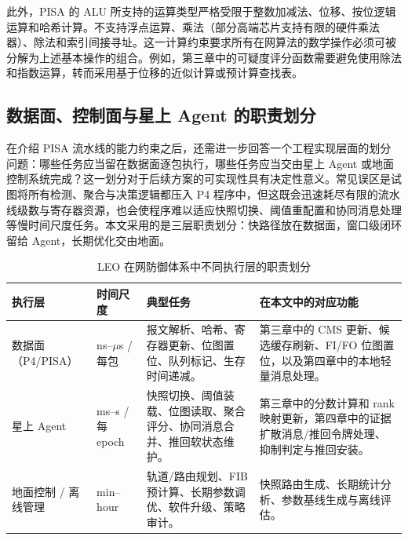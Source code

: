 此外，PISA 的 ALU 所支持的运算类型严格受限于整数加减法、位移、按位逻辑运算和哈希计算。不支持浮点运算、乘法（部分高端芯片支持有限的硬件乘法器）、除法和索引间接寻址。这一计算约束要求所有在网算法的数学操作必须可被分解为上述基本操作的组合。例如，第三章中的可疑度评分函数需要避免使用除法和指数运算，转而采用基于位移的近似计算或预计算查找表。


\subsection{数据面、控制面与星上 Agent 的职责划分}

在介绍 PISA 流水线的能力约束之后，还需进一步回答一个工程实现层面的划分问题：哪些任务应当留在数据面逐包执行，哪些任务应当交由星上 Agent 或地面控制系统完成？这一划分对于后续方案的可实现性具有决定性意义。常见误区是试图将所有检测、聚合与决策逻辑都压入 P4 程序中，但这既会迅速耗尽有限的流水线级数与寄存器资源，也会使程序难以适应快照切换、阈值重配置和协同消息处理等慢时间尺度任务。本文采用的是三层职责划分：快路径放在数据面，窗口级闭环留给 Agent，长期优化交由地面。

\begin{table}[t]
\centering
\caption{LEO 在网防御体系中不同执行层的职责划分}
\label{tab:ch2_plane_roles}
\small
\begin{tabular}{@{}
>{\raggedright\arraybackslash}p{2.4cm}
>{\raggedright\arraybackslash}p{2.2cm}
>{\raggedright\arraybackslash}p{4.0cm}
>{\raggedright\arraybackslash}p{4.0cm}
@{}}
\toprule
\textbf{执行层} & \textbf{时间尺度} & \textbf{典型任务} & \textbf{在本文中的对应功能} \\
\midrule
数据面（P4/PISA） & ns--$\mu$s / 每包 & 报文解析、哈希、寄存器更新、位图置位、队列标记、生存时间递减。 & 第三章中的 CMS 更新、候选缓存刷新、FI/FO 位图置位，以及第四章中的本地轻量消息处理。 \\
\midrule
星上 Agent & ms--s / 每 epoch & 快照切换、阈值装载、位图读取、聚合评分、协同消息合并、推回软状态维护。 & 第三章中的分数计算和 rank 映射更新，第四章中的证据扩散消息/推回令牌处理、抑制判定与推回安装。 \\
\midrule
地面控制 / 离线管理 & min--hour & 轨道/路由规划、FIB 预计算、长期参数调优、软件升级、策略审计。 & 快照路由生成、长期统计分析、参数基线生成与离线评估。 \\
\bottomrule
\end{tabular}
\end{table}

